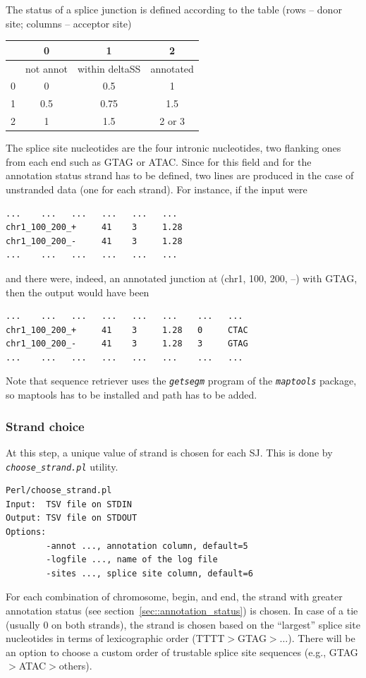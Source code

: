 \documentclass{article}
\newcommand{\prog}[1]{{\tt\em #1}}
\begin{document}
The status of a splice junction is defined according to the table (rows -- donor site; columns -- acceptor site)\\
\begin{center}
\begin{tabular}{|c|c|c|c|}
\hline
         & 0 & 1 & 2\\
\hline
         & not annot & within deltaSS & annotated\\
\hline
0        &0         &0.5         & 1\\
\hline
1        &0.5         &0.75         & 1.5\\
\hline
2        &1        &1.5        &2 or 3\\
\hline
\end{tabular}
\end{center}

The splice site nucleotides are the four intronic nucleotides, two flanking ones from each end such as GTAG or ATAC. Since for this field and for the annotation status strand 
has to be defined, two lines are produced in the case of unstranded data (one for each strand). For instance, if the input were
\begin{verbatim}
...    ...   ...   ...   ...   ...
chr1_100_200_+     41    3     1.28
chr1_100_200_-     41    3     1.28
...    ...   ...   ...   ...   ...
\end{verbatim}
and there were, indeed, an annotated junction at (chr1, 100, 200, --) with GTAG, then the output would have been
\begin{verbatim}
...    ...   ...   ...   ...   ...    ...   ...
chr1_100_200_+     41    3     1.28   0     CTAC
chr1_100_200_-     41    3     1.28   3     GTAG
...    ...   ...   ...   ...   ...    ...   ...
\end{verbatim}

Note that sequence retriever uses the \prog{getsegm} program of the \prog{maptools} package, so maptools has to be installed and path has to be added.


\subsubsection{Strand choice}
At this step, a unique value of strand is chosen for each SJ. This is done by \prog{choose\_strand.pl} utility. 
\begin{verbatim}
Perl/choose_strand.pl
Input:  TSV file on STDIN
Output: TSV file on STDOUT
Options:
        -annot ..., annotation column, default=5
        -logfile ..., name of the log file
        -sites ..., splice site column, default=6
\end{verbatim}
For each combination of chromosome, begin, and end, the strand with greater annotation status (see section~\ref{sec::annotation_status}) is chosen. In case of 
a tie (usually $0$ on both strands), the strand is chosen based on the ``largest'' splice site nucleotides in terms of lexicographic order (TTTT$>$GTAG$>\dots$).
There will be an option to choose a custom order of trustable splice site sequences (e.g., GTAG$>$ATAC$>$others).
\end{document}
